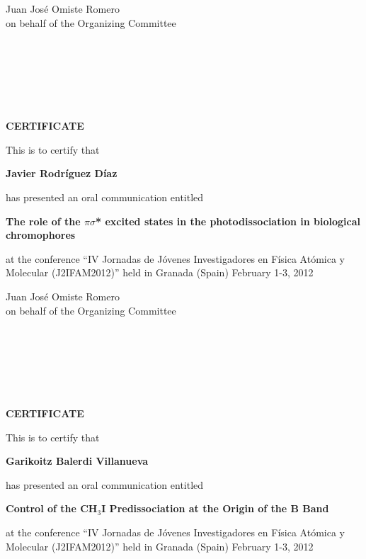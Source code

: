 \documentclass [13pt,a4paper] {letter}
\begin{document}
\vspace {3cm}
\begin{raggedleft}
Juan José Omiste Romero\\
on behalf of the Organizing Committee
\newpage
\end{raggedleft}
\begin{verbatim}






\end{verbatim}
\pagestyle{empty}
\begin{center}
{\bf {\Huge CERTIFICATE}}

\vspace {1.5cm}
This is to certify that
\vspace {1cm}

{\bf \Large  Javier    Rodríguez Díaz }
\vspace {1cm}

has presented an oral communication entitled
\vspace {1cm}

{\bf \large  The role of the $\pi\sigma$* excited states in the photodissociation in biological chromophores }
\vspace {1cm}

at the conference { \textquotedblleft IV Jornadas de Jóvenes Investigadores en Física Atómica y Molecular (J2IFAM2012)\textquotedblright} 
held in Granada (Spain) February 1-3, 2012
\end{center}
\vspace {3cm}
\begin{raggedleft}
Juan José Omiste Romero\\
on behalf of the Organizing Committee
\newpage
\end{raggedleft}
\begin{verbatim}






\end{verbatim}
\pagestyle{empty}
\begin{center}
{\bf {\Huge CERTIFICATE}}

\vspace {1.5cm}
This is to certify that
\vspace {1cm}

{\bf \Large  Garikoitz  Balerdi  Villanueva }
\vspace {1cm}

has presented an oral communication entitled
\vspace {1cm}

{\bf \large  Control of the CH$_3$I Predissociation at the Origin of the B Band }
\vspace {1cm}

at the conference { \textquotedblleft IV Jornadas de Jóvenes Investigadores en Física Atómica y Molecular (J2IFAM2012)\textquotedblright} 
held in Granada (Spain) February 1-3, 2012
\end{center}
\end{document}
